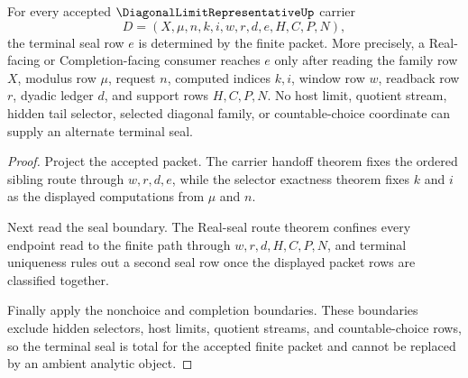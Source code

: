 \begin{theorem}
\label{thm:diagonal-limit-representative-terminal-seal-choice-free-totality}
For every accepted $\DiagonalLimitRepresentativeUp$ carrier
$$
D=(X,\mu,n,k,i,w,r,d,e,H,C,P,N),
$$
the terminal seal row $e$ is determined by the finite packet. More precisely, a Real-facing or Completion-facing consumer reaches $e$ only after reading the family row $X$, modulus row $\mu$, request $n$, computed indices $k,i$, window row $w$, readback row $r$, dyadic ledger $d$, and support rows $H,C,P,N$. No host limit, quotient stream, hidden tail selector, selected diagonal family, or countable-choice coordinate can supply an alternate terminal seal.
\end{theorem}
\begin{proof}
Project the accepted packet. The carrier handoff theorem fixes the ordered sibling route through $w,r,d,e$, while the selector exactness theorem fixes $k$ and $i$ as the displayed computations from $\mu$ and $n$.

Next read the seal boundary. The Real-seal route theorem confines every endpoint read to the finite path through $w,r,d,H,C,P,N$, and terminal uniqueness rules out a second seal row once the displayed packet rows are classified together.

Finally apply the nonchoice and completion boundaries. These boundaries exclude hidden selectors, host limits, quotient streams, and countable-choice rows, so the terminal seal is total for the accepted finite packet and cannot be replaced by an ambient analytic object.
\end{proof}


